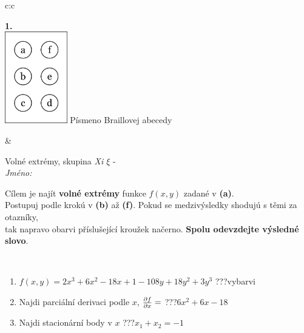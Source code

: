 \documentclass[10pt]{report}
\begin{document}
\begin{tabular}{c:c}
\begin{minipage}[c][104.5mm][t]{0.5\linewidth}
\begin{center}
\begin{minipage}{0.20\linewidth}
\begin{center}
{\Huge\bfseries 1.} \\[2mm]
\includegraphics[height=40mm]{../images/braille.png}
{\small Písmeno Braillovej abecedy}
\end{center}
\end{minipage}
\end{center}
\end{minipage}
&
\begin{minipage}[c][104.5mm][t]{0.5\linewidth}
\begin{center}
\vspace{7mm}
{\huge Volné extrémy, skupina \textit{Xi $\xi$} -}\\[5mm]
\textit{Jméno:}\phantom{xxxxxxxxxxxxxxxxxxxxxxxxxxxxxxxxxxxxxxxxxxxxxxxxxxxxxxxxxxxxxxxxx}\\[5mm]
\begin{minipage}{0.95\linewidth}
\begin{center}
Cílem je najít \textbf{volné extrémy} funkce $f(x,y)$ zadané v \textbf{(a)}.\\Postupuj podle krokú v \textbf{(b)} až \textbf{(f)}. Pokud se medzivýsledky shodujú s těmi za otazníky,\\tak napravo obarvi příslušející kroužek načerno. \textbf{Spolu odevzdejte výsledné slovo}.
\end{center}
\end{minipage}
\\[1mm]
\begin{minipage}{0.79\linewidth}
\begin{center}
\begin{varwidth}{\linewidth}
\begin{enumerate}
\normalsize
\item $f(x,y)=2x^3+6x^2-18x+1-108y+18y^2+3y^3$\quad \dotfill\; ???\;\dotfill \quad vybarvi
\item Najdi parciální derivaci podle $x$, $\pdv{f}{x}=$\quad \dotfill\; ???\;\dotfill \quad $6x^2+6x-18$
\item Najdi stacionární body v $x$\quad \dotfill\; ???\;\dotfill \quad $x_1+x_2=-1$

\end{enumerate}
\end{varwidth}
\end{center}
\end{minipage}
\end{center}
\end{minipage}
\end{tabular}
\end{document}
